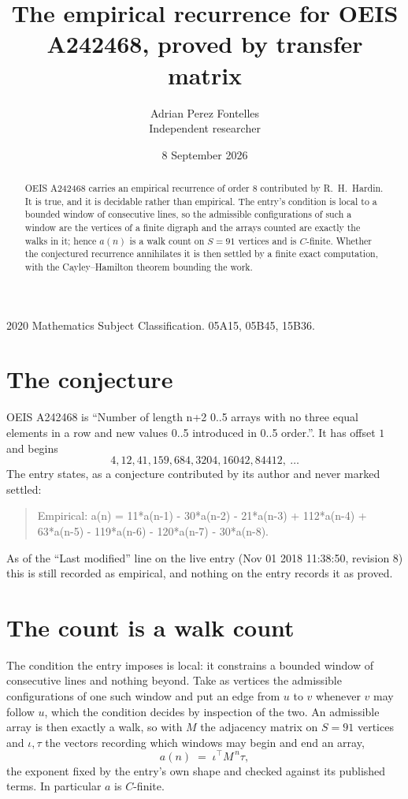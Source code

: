 \documentclass[11pt,a4paper]{article}
\title{The empirical recurrence for OEIS A242468, proved by transfer matrix}
\author{Adrian Perez Fontelles\\ \small Independent researcher}
\date{8 September 2026}
\theoremstyle{plain}
\theoremstyle{definition}
\begin{document}
\maketitle

\begin{abstract}
OEIS A242468 carries an empirical recurrence of order $8$ contributed by R.~H.~Hardin. It is
true, and it is decidable rather than empirical. The entry's condition is local to a bounded window of consecutive lines, so
the admissible configurations of such a window are the vertices of a finite digraph and the
arrays counted are exactly the walks in it; hence $a(n)$ is a walk count on $S=91$ vertices
and is $C$-finite. Whether the conjectured recurrence annihilates it is then settled by a
finite exact computation, with the Cayley--Hamilton theorem bounding the work.
\end{abstract}

\noindent\small 2020 Mathematics Subject Classification. 05A15, 05B45, 15B36.\normalsize

\section{The conjecture}

OEIS A242468 is ``Number of length n+2 0..5 arrays with no three equal elements in a row and new values 0..5 introduced in 0..5 order.''. It has offset $1$ and begins
\[
4, 12, 41, 159, 684, 3204, 16042, 84412,\ \dots
\]
The entry states, as a conjecture contributed by its author and never marked settled:
\begin{quote}
Empirical: a(n) = 11*a(n-1) - 30*a(n-2) - 21*a(n-3) + 112*a(n-4) + 63*a(n-5) - 119*a(n-6) - 120*a(n-7) - 30*a(n-8).
\end{quote}
As of the ``Last modified'' line on the live entry (Nov 01 2018 11:38:50, revision 8) this is still
recorded as empirical, and nothing on the entry records it as proved.

\section{The count is a walk count}

The condition the entry imposes is local: it constrains a bounded window of consecutive lines and nothing beyond. Take as
vertices the admissible configurations of one such window and put an edge from $u$ to $v$
whenever $v$ may follow $u$, which the condition decides by inspection of the two. An
admissible array is then exactly a walk, so with $M$ the adjacency matrix on $S=91$ vertices
and $\iota,\tau$ the vectors recording which windows may begin and end an array,
\[
a(n)\;=\;\iota^{\!\top}M^{\,n}\tau ,
\]
the exponent fixed by the entry's own shape and checked against its published terms. In
particular $a$ is $C$-finite.
\end{document}
